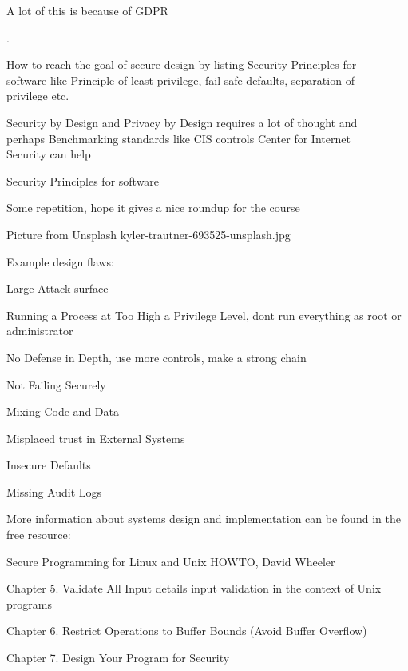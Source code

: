\documentclass[Screen16to9,17pt]{foils}
\begin{document}
\vskip 2cm
\centerline{A lot of this is because of GDPR}


.

\begin{list2}
\item How to reach the goal of secure design
by listing Security Principles for \\
software like Principle of least privilege, fail-safe defaults, separation of\\
privilege etc.
\item Security by Design and Privacy by Design requires a lot of thought and\\ perhaps Benchmarking standards
like CIS controls Center for Internet\\
 Security can help
\item Security Principles for software
\item Some repetition, hope it gives a nice roundup for the course
\end{list2}

\hfill {\footnotesize Picture from Unsplash kyler-trautner-693525-unsplash.jpg}


Example design flaws:
\begin{list2}
\item Large Attack surface
\item Running a Process at Too High a Privilege Level, dont run everything as root or administrator
\item No Defense in Depth, use more controls, make a strong chain
\item Not Failing Securely
\item Mixing Code and Data
\item Misplaced trust in External Systems
\item Insecure Defaults
\item Missing Audit Logs
\end{list2}


\begin{list1}
\item More information about systems design and implementation can be found in the free resource:
\item Secure Programming for Linux and Unix HOWTO, David Wheeler
\item {}
\item Chapter 5. Validate All Input details input validation in the context of Unix programs
\item Chapter 6. Restrict Operations to Buffer Bounds (Avoid Buffer Overflow)
\item Chapter 7. Design Your Program for Security
\end{list1}
\end{document}
